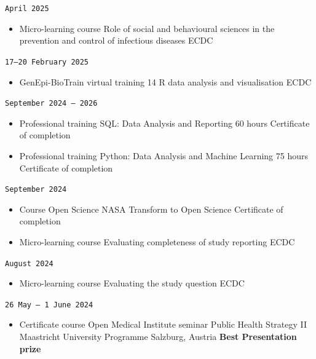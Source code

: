 \documentclass[
  10.5pt,
  a4paper,
  DIV=11,
  numbers=noendperiod]{scrartcl}
\providecommand{\tightlist}{%
  \setlength{\itemsep}{0pt}\setlength{\parskip}{0pt}}
\let\oldtexttt\texttt
\renewcommand{\texttt}[1]{{\color{cvbronze}\small\oldtexttt{#1}}}
\begin{document}
\texttt{April\ 2025}

\begin{itemize}
\tightlist
\item
  Micro-learning course \textbar{} Role of social and behavioural
  sciences in the prevention and control of infectious diseases
  \textbar{} ECDC
\end{itemize}

\texttt{17–20\ February\ 2025}

\begin{itemize}
\tightlist
\item
  GenEpi-BioTrain virtual training 14 \textbar{} R data analysis and
  visualisation \textbar{} ECDC
\end{itemize}

\texttt{September\ 2024\ –\ 2026}

\begin{itemize}
\tightlist
\item
  Professional training \textbar{} SQL: Data Analysis and Reporting
  \textbar{} 60 hours \textbar{} Certificate of completion
\item
  Professional training \textbar{} Python: Data Analysis and Machine
  Learning \textbar{} 75 hours \textbar{} Certificate of completion
\end{itemize}

\texttt{September\ 2024}

\begin{itemize}
\tightlist
\item
  Course \textbar{} Open Science \textbar{} NASA Transform to Open
  Science \textbar{} Certificate of completion
\item
  Micro-learning course \textbar{} Evaluating completeness of study
  reporting \textbar{} ECDC
\end{itemize}

\texttt{August\ 2024}

\begin{itemize}
\tightlist
\item
  Micro-learning course \textbar{} Evaluating the study question
  \textbar{} ECDC
\end{itemize}

\texttt{26\ May\ –\ 1\ June\ 2024}

\begin{itemize}
\tightlist
\item
  Certificate course \textbar{} Open Medical Institute seminar
  \textbar{} Public Health Strategy II \textbar{} Maastricht University
  Programme \textbar{} Salzburg, Austria \textbar{} \textbf{Best
  Presentation prize}
\end{itemize}
\end{document}
